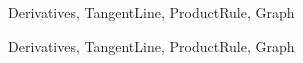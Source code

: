 \begin{tagblock}{Derivatives, TangentLine, ProductRule, Graph}
\begin{question}
	
	
\begin{tags}
	    Derivatives, TangentLine, ProductRule, Graph
\end{tags}
	
\begin{diary}
\end{diary}
	
\begin{solution}
	   
\end{solution}
	
\end{question}

\end{tagblock}


